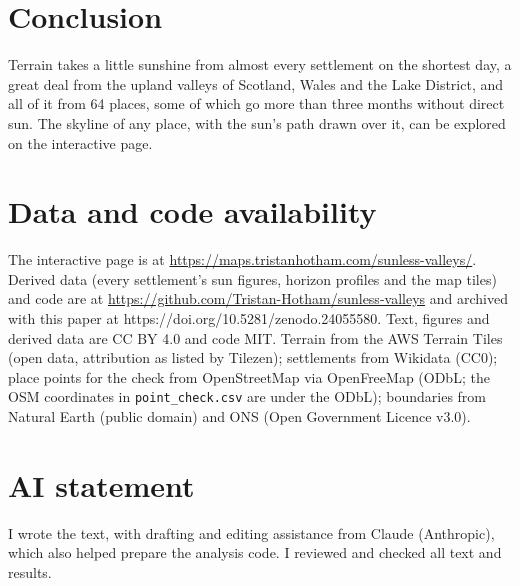 \documentclass[11pt,a4paper]{article}
\begin{document}
\section{Conclusion}
Terrain takes a little sunshine from almost every settlement on the shortest day, a great deal from the upland valleys of Scotland, Wales and the Lake District, and all of it from 64 places, some of which go more than three months without direct sun. The skyline of any place, with the sun's path drawn over it, can be explored on the interactive page.

\section*{Data and code availability}
The interactive page is at \url{https://maps.tristanhotham.com/sunless-valleys/}. Derived data (every settlement's sun figures, horizon profiles and the map tiles) and code are at \url{https://github.com/Tristan-Hotham/sunless-valleys} and archived with this paper at https://doi.org/10.5281/zenodo.24055580. Text, figures and derived data are CC BY 4.0 and code MIT. Terrain from the AWS Terrain Tiles (open data, attribution as listed by Tilezen); settlements from Wikidata (CC0); place points for the check from OpenStreetMap via OpenFreeMap (ODbL; the OSM coordinates in \texttt{point\_check.csv} are under the ODbL); boundaries from Natural Earth (public domain) and ONS (Open Government Licence v3.0).

\section*{AI statement}
I wrote the text, with drafting and editing assistance from Claude (Anthropic), which also helped prepare the analysis code. I reviewed and checked all text and results.
\end{document}
